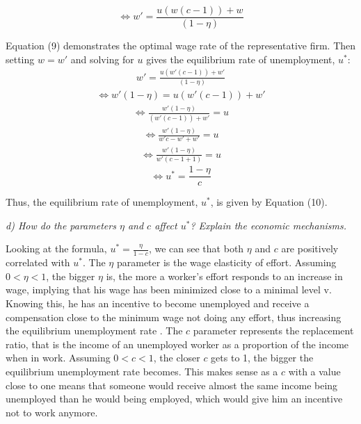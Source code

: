 \documentclass[11pt]{article} %
\begin{document}
\begin{equation}
   \Longleftrightarrow w' = \frac{u\left(w(c-1)\right) + w} {(1 - \eta)}
\end{equation}

\bigskip
Equation (9) demonstrates the optimal wage rate of the representative firm. Then setting $w=w'$ and solving for $u$ gives the equilibrium rate of unemployment, $u^*$:
\begin{align*}
    w' = \frac{u\left(w'(c-1)\right) + w'} {(1 - \eta)}
\end{align*}
\begin{align*}
   \Longleftrightarrow w'(1 - \eta) = {u\left(w'(c-1)\right) + w'} 
\end{align*}
\begin{align*}
    \Longleftrightarrow \frac {w'(1 -\eta)} {\left(w'(c-1)\right) + w'} = {u} 
\end{align*}
\begin{align*}
    \Longleftrightarrow \frac {w'(1 -\eta)} {w'c-w' + w'} = {u} 
\end{align*}
\begin{align*}
    \Longleftrightarrow \frac {w'(1 -\eta)} {w'(c-1+1)} = {u} 
\end{align*}
\begin{equation}
    \Longleftrightarrow u^* = \frac {1 -\eta} {c}
\end{equation}

\bigskip
Thus, the equilibrium rate of unemployment, $u^*$, is given by Equation (10).



\pagebreak
\textit{d) How do the parameters $\eta$ and $c$ affect $u^*$? Explain the economic mechanisms.}

\bigskip
Looking at the formula, $u^* = \frac {\eta} {1 -c}$, we can see that both $\eta$ and $c$ are positively correlated with $u^*$. The $\eta$ parameter is the wage elasticity of effort. Assuming $0 < \eta < 1$, the bigger $\eta$ is, the more a worker's effort responds to an increase in wage, implying that his wage has been minimized close to a minimal level v. Knowing this, he has an incentive to become unemployed and receive a compensation close to the minimum wage not doing any effort, thus increasing the equilibrium unemployment rate . The $c$ parameter represents the replacement ratio, that is the income of an unemployed worker as a proportion of the income when in work. Assuming $0 < c < 1$, the closer $c$ gets to 1, the bigger the equilibrium unemployment rate becomes. This makes sense as a $c$ with a value close to one means that someone would receive almost the same income being unemployed than he would being employed, which would give him an incentive not to work anymore.
\end{document}
